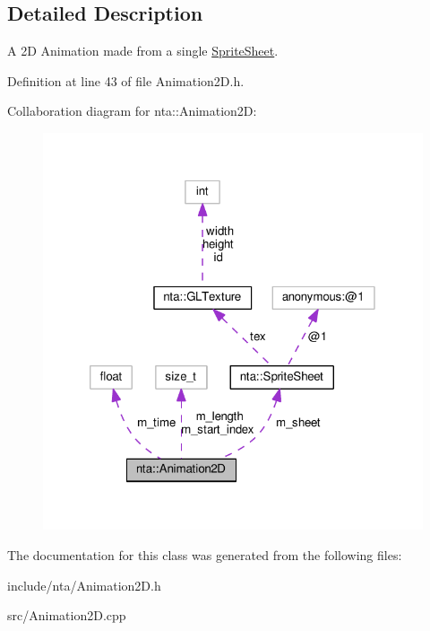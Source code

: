 \subsection{Detailed Description}
A 2D Animation made from a single \hyperlink{structnta_1_1SpriteSheet}{Sprite\+Sheet}. 

Definition at line 43 of file Animation2\+D.\+h.



Collaboration diagram for nta\+:\+:Animation2D\+:
\nopagebreak
\begin{figure}[H]
\begin{center}
\leavevmode
\includegraphics[width=320pt]{db/d21/classnta_1_1Animation2D__coll__graph}
\end{center}
\end{figure}


The documentation for this class was generated from the following files\+:\begin{DoxyCompactItemize}
\item 
include/nta/Animation2\+D.\+h\item 
src/Animation2\+D.\+cpp\end{DoxyCompactItemize}
